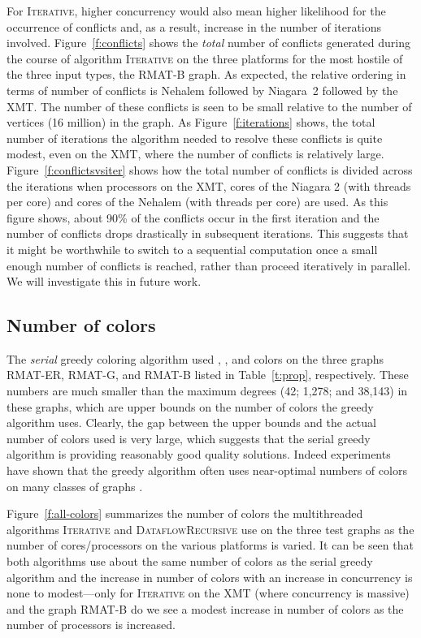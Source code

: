 \documentclass{article}
\begin{document}
For \textsc{Iterative}, higher concurrency would also mean higher likelihood
for the occurrence of conflicts and, as a result, increase in the number of iterations
involved. Figure~\ref{f:conflicts} shows the {\em total} number of conflicts generated during the
course of algorithm \textsc{Iterative} on the three platforms for 
the most hostile of the three input types, the RMAT-B graph. 
As expected, the relative ordering in terms of number of conflicts
is Nehalem followed by Niagara~2 followed by the XMT. 
The number of these conflicts is seen to be small relative to the number of vertices
(16 million) in the graph. 
As Figure~\ref{f:iterations} shows, the total number of iterations the algorithm needed
to resolve these conflicts is quite modest, even on the XMT, 
where the number of conflicts is relatively large.
Figure~\ref{f:conflictsvsiter} shows how the total number of conflicts is divided across 
the iterations when  processors on the XMT,  cores of the Niagara 2 
(with  threads per core) and  cores of the Nehalem 
(with  threads per core) are used. As this figure shows, 
about 90\% of the conflicts occur in the first iteration and 
the number of conflicts drops drastically in subsequent iterations.
This suggests that it might be worthwhile to switch to a sequential computation
once a small enough number of conflicts is reached, rather than proceed iteratively in parallel.
We will investigate this in future work. 



\subsection{Number of colors}
\label{sec:colors}

The {\em serial} greedy coloring algorithm used , , and  
colors on the three graphs RMAT-ER, RMAT-G, and RMAT-B listed 
in Table~\ref{t:prop},  respectively. 
These numbers are much smaller than the 
maximum degrees (42; 1,278; and 38,143) in these graphs, 
which are upper bounds on the number of colors the greedy algorithm uses. 
Clearly, the gap between the upper bounds and the actual number of colors used is very large,
which suggests that the serial greedy algorithm is providing reasonably 
good quality solutions. Indeed experiments have shown that the greedy algorithm  
often uses near-optimal numbers of colors on many classes of graphs \cite{CoMo:83, colpack-acm}.  

Figure~\ref{f:all-colors} summarizes  the number of colors the multithreaded algorithms 
\textsc{Iterative} and \textsc{DataflowRecursive} use on the three test graphs 
as the number of cores/processors on the various platforms is varied. 
It can be seen that both algorithms use about the same number of colors as the serial greedy algorithm
and the increase in number of colors with an increase in concurrency is 
none to modest---only for \textsc{Iterative} on the XMT 
(where concurrency is massive) and the graph RMAT-B do we see a modest increase
in number of colors as the number of processors is increased.
\end{document}
